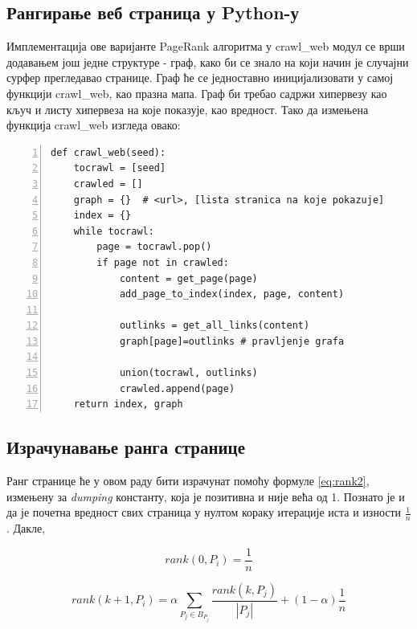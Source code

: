 \subsection{Рангирање веб страница у Python-у}

Имплементација ове варијанте PageRank алгоритма у crawl\_web модул се врши додавањем још једне структуре - граф, како би се знало на који начин је случајни сурфер прегледавао странице. Граф ће се једноставно иницијализовати у самој функцији crawl\_web, као празна мапа. Граф би требао садржи хипервезу као кључ и листу хипервеза на које показује, као вредност. Тако да измењена функција crawl\_web изгледа овако:

\begin{lstlisting}[caption=Увођење графа у crawl\_web, label={lst:graph}, numbers=left]
def crawl_web(seed):
    tocrawl = [seed]
    crawled = []
    graph = {}  # <url>, [lista stranica na koje pokazuje]
    index = {}
    while tocrawl:
        page = tocrawl.pop()
        if page not in crawled:
            content = get_page(page)
            add_page_to_index(index, page, content)

            outlinks = get_all_links(content)
            graph[page]=outlinks # pravljenje grafa

            union(tocrawl, outlinks)
            crawled.append(page)
    return index, graph
\end{lstlisting}

\subsection{Израчунавање ранга странице}

Ранг странице ће у овом раду бити израчунат помоћу формуле \ref{eq:rank2}, измењену за \emph{dumping} константу, која је позитивна и није већа од 1. Познато је и да је почетна вредност свих страница у нултом кораку итерације иста и изности $\frac{1}{n}$. Дакле,

\begin{equation}\label{eq:zero}
rank(0, P_{i})=\frac{1}{n}
\end{equation}

\begin{equation}
rank(k+1, P_{i})=\alpha \sum_{P_{j} \in B_{P_{j}}}\frac{rank(k, P_{j})}{\left |P_{j}  \right |} + (1-\alpha)\frac{1}{n}
\end{equation}


